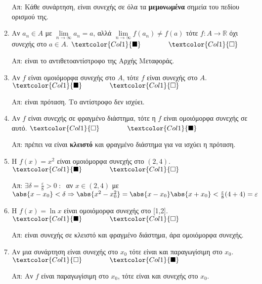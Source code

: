 \begin{enumerate}[itemsep=.5\baselineskip]
    Απ: Κάθε συνάρτηση, είναι συνεχής σε όλα τα \textbf{μεμονωμένα} σημεία του πεδίου 
    ορισμού της.

  \item \textcolor{Col1}{Αν $ a_{n} \in A $ με $ \lim\limits_{n \to \infty} a_{n}=a $,  
      αλλά $ \lim\limits_{n \to \infty} f(a_{n}) \neq f(a) $ τότε $ f \colon A \to 
    \mathbb{R}$ όχι συνεχής στο $ a \in A $}.
    \hfill $\textcolor{Col1}{\blacksquare} \qquad \qquad \textcolor{Col1}{\square}$

    Απ: είναι το αντιθετοαντίστροφο της Αρχής Μεταφοράς.

  \item \textcolor{Col1}{Αν $f$ είναι ομοιόμορφα συνεχής στο $A$, τότε $f$ είναι  
    συνεχής στο $A$}.
    \hfill $\textcolor{Col1}{\blacksquare} \qquad \qquad \textcolor{Col1}{\square}$

    Απ: είναι πρόταση. Το αντίστροφο δεν ισχύει.

  \item \textcolor{Col1}{Αν $f$ είναι συνεχής σε φραγμένο διάστημα, τότε η $f$ 
    είναι ομοιόμορφα συνεχής σε αυτό}.
    \hfill $\textcolor{Col1}{\square} \qquad \qquad \textcolor{Col1}{\blacksquare}$

    Απ: πρέπει να είναι \textbf{κλειστό} και φραγμένο διάστημα για να ισχύει η πρόταση.

  \item \textcolor{Col1}{Η $ f(x)=x^{2} $ είναι ομοιόμορφα συνεχής στο $ (2,4) $}.
    \hfill $\textcolor{Col1}{\blacksquare} \qquad \qquad \textcolor{Col1}{\square}$

    Απ: $ \exists \delta = \frac{\varepsilon}{8} > 0 \; : \; $ αν $ x \in (2,4) $ με 
    $ \abs{x- x_{0}} < \delta \Rightarrow \abs{x^{2}- x_{0}^{2}} = \abs{x- x_{0}}
    \abs{x+ x_{0}} < \frac{\varepsilon}{8} (4+4) = \varepsilon $

  \item \textcolor{Col1}{Η $ f(x)= \ln{x} $ είναι ομοιόμορφα συνεχής στο [1,2]}.
    \hfill $\textcolor{Col1}{\blacksquare} \qquad \qquad \textcolor{Col1}{\square}$

    Απ: είναι συνεχής σε κλειστό και φραγμένο διάστημα, άρα ομοιόμορφα συνεχής.

  \item \textcolor{Col1}{Αν μια συνάρτηση είναι συνεχής στο $ x_{0} $ τότε είναι και 
    παραγωγίσιμη στο $ x_{0} $}.
    \hfill $\textcolor{Col1}{\square} \qquad \qquad \textcolor{Col1}{\blacksquare}$

    Απ: Αν $f$ είναι παραγωγίσιμη στο $ x_{0} $, τότε είναι και συνεχής στο $ x_{0} $.


\end{enumerate}
